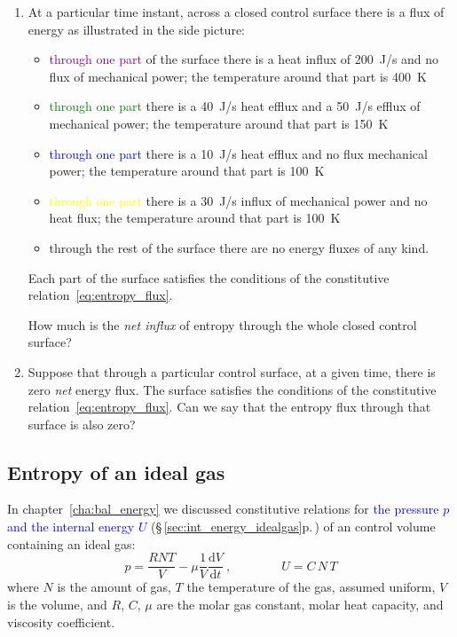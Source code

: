 \documentclass[a4paper,12pt,%
onecolumn,oneside,%
british%
]{memoir}
\newcommand*{\di}{\mathrm{d}}%
\renewcommand*{\|}[1][]{\nonscript\:#1\vert\nonscript\:\mathopen{}}
\newcommand*{\sect}{\S}%
\newcommand*{\chap}{chapter}%
\renewcommand*{\autoref}[3][\sect\,\ref]{\textcolor{blue}{#3} {\color{blue}\scriptsize(\faIcon[regular]{eye}\;#1{#2}\;p.\,\pageref{#2})}}
\newcommand*{\yvis}{\mu} %
\newcommand*{\dt}{\di t}
\newcommand*{\yN}{N}
\newcommand*{\yU}{U}
\newcommand*{\ypr}{p} %
\newcommand*{\yT}{T}%
\begin{document}
\begin{exercise}
  \begin{enumerate}[exerc]
  \item At a particular time instant, across a closed control surface there is a flux of energy as illustrated in the side picture:
    \begin{itemize}
    \item \textcolor{purple}{through one part} of the surface there is a heat influx of \qty{200}{J/s} and no flux of mechanical power; the temperature around that part is \qty{400}{K}
    \item \textcolor{green}{through one part} there is a \qty{40}{J/s} heat efflux and a \qty{50}{J/s} efflux of mechanical power; the temperature around that part is \qty{150}{K}
    \item \textcolor{blue}{through one part} there is a  \qty{10}{J/s} heat efflux and no flux mechanical power; the temperature around that part is \qty{100}{K}
    \item \textcolor{yellow}{through one part}  there is a  \qty{30}{J/s} influx of mechanical power and no heat flux; the temperature around that part is \qty{100}{K}
    \item \textcolor{midgrey}{through the rest} of the surface there are no energy fluxes of any kind.
    \end{itemize}
    Each part of the surface satisfies the conditions of the constitutive relation~\eqref{eq:entropy_flux}.

    \smallskip

    How much is the \emph{net influx} of entropy through the whole closed control surface?

    \bigskip

  \item Suppose that through a particular control surface, at a given time, there is zero \emph{net} energy flux. The surface satisfies the conditions of the constitutive relation~\eqref{eq:entropy_flux}. Can we say that the entropy flux through that surface is also zero?
  \end{enumerate}
\end{exercise}

\subsection{Entropy of an ideal gas}
\label{sec:entropy_ideal_gas}

In \chap~\ref{cha:bal_energy} we discussed constitutive relations for \autoref{sec:int_energy_idealgas}{the pressure $\ypr$ and the internal energy $\yU$} of an control volume containing an ideal gas:
\begin{equation*}
  \ypr = \frac{R \yN \yT}{V}  - \yvis \frac{1}{V}\frac{\di V}{\dt} \ ,
  \qquad\qquad
  \yU = C\,\yN\,\yT
\end{equation*}
where $\yN$ is the amount of gas, $\yT$ the temperature of the gas, assumed uniform, $V$ is the volume, and $R$, $C$, $\yvis$ are the molar gas constant, molar heat capacity, and viscosity coefficient.
\end{document}
